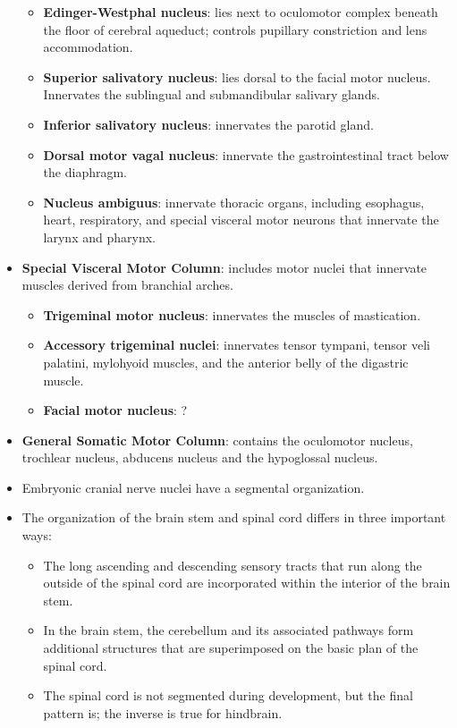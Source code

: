 \documentclass[12pt,a4paper]{article}
\begin{document}
\begin{itemize}
        \begin{itemize}
            \item \textbf{Edinger-Westphal nucleus}: lies next to oculomotor complex beneath the floor of cerebral aqueduct; controls pupillary constriction and lens accommodation.
            \item \textbf{Superior salivatory nucleus}: lies dorsal to the facial motor nucleus. Innervates the sublingual and submandibular salivary glands.
            \item \textbf{Inferior salivatory nucleus}: innervates the parotid gland. 
            \item \textbf{Dorsal motor vagal nucleus}: innervate the gastrointestinal tract below the diaphragm.
            \item \textbf{Nucleus ambiguus}: innervate thoracic organs, including esophagus, heart, respiratory, and special visceral motor neurons that innervate the larynx and pharynx.
        \end{itemize}
    \item \textbf{Special Visceral Motor Column}: includes motor nuclei that innervate muscles derived from branchial arches.
        \begin{itemize}
            \item \textbf{Trigeminal motor nucleus}: innervates the muscles of mastication. 
            \item \textbf{Accessory trigeminal nuclei}: innervates tensor tympani, tensor veli palatini, mylohyoid muscles, and the anterior belly of the digastric muscle.
            \item \textbf{Facial motor nucleus}: ?
        \end{itemize}
    \item \textbf{General Somatic Motor Column}: contains the oculomotor nucleus, trochlear nucleus, abducens nucleus and the hypoglossal nucleus.
    \item Embryonic cranial nerve nuclei have a segmental organization.
    \item The organization of the brain stem and spinal cord differs in three important ways:
        \begin{itemize}
            \item The long ascending and descending sensory tracts that run along the outside of the spinal cord are incorporated within the interior of the brain stem. 
            \item In the brain stem, the cerebellum and its associated pathways form additional structures that are superimposed on the basic plan of the spinal cord.
            \item The spinal cord is not segmented during development, but the final pattern is; the inverse is true for hindbrain.
        \end{itemize}
\end{itemize}
\end{document}
